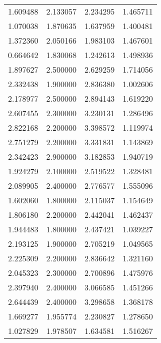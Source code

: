 \begin{longtable}{rrrr}
 1.609488 &        2.133057 &          2.234295 &                1.465711 \\
 1.070038 &        1.870635 &          1.637959 &                1.400481 \\
 1.372360 &        2.050166 &          1.983103 &                1.467601 \\
 0.664642 &        1.830068 &          1.242613 &                1.498936 \\
 1.897627 &        2.500000 &          2.629259 &                1.714056 \\
 2.332438 &        1.900000 &          2.836380 &                1.002606 \\
 2.178977 &        2.500000 &          2.894143 &                1.619220 \\
 2.607455 &        2.300000 &          3.230131 &                1.286496 \\
 2.822168 &        2.200000 &          3.398572 &                1.119974 \\
 2.751279 &        2.200000 &          3.331831 &                1.143869 \\
 2.342423 &        2.900000 &          3.182853 &                1.940719 \\
 1.924279 &        2.100000 &          2.519522 &                1.328481 \\
 2.089905 &        2.400000 &          2.776577 &                1.555096 \\
 1.602060 &        1.800000 &          2.115037 &                1.154649 \\
 1.806180 &        2.200000 &          2.442041 &                1.462437 \\
 1.944483 &        1.800000 &          2.437421 &                1.039227 \\
 2.193125 &        1.900000 &          2.705219 &                1.049565 \\
 2.225309 &        2.200000 &          2.836642 &                1.321160 \\
 2.045323 &        2.300000 &          2.700896 &                1.475976 \\
 2.397940 &        2.400000 &          3.066585 &                1.451266 \\
 2.644439 &        2.400000 &          3.298658 &                1.368178 \\
 1.669277 &        1.955774 &          2.230827 &                1.278650 \\
 1.027829 &        1.978507 &          1.634581 &                1.516267 \\

\end{longtable}
